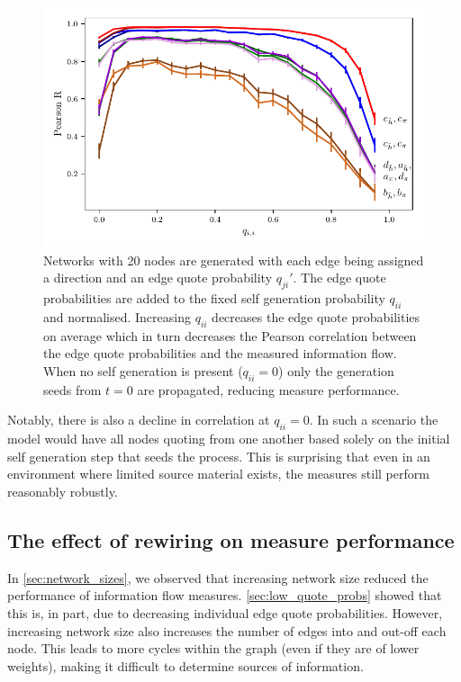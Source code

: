 \begin{figure}[!htbp]
	\centering
	\includegraphics{chapter3/figs/zipf_self_p.pdf}
	\caption{Networks with 20 nodes are generated with each edge being assigned a direction and an edge quote probability $q_{ji}'$. The edge quote probabilities are added to the fixed self generation probability $q_{ii}$ and normalised. Increasing $q_{ii}$ decreases the edge quote probabilities on average which in turn decreases the Pearson correlation between the edge quote probabilities and the measured information flow. When no self generation is present ($q_{ii}=0$) only the generation seeds from $t=0$ are propagated, reducing measure performance.}
	\label{fig:flow_self_p_vs_pearson_R}
\end{figure}

Notably, there is also a decline in correlation at $q_{ii}=0$. In such a scenario the model would have all nodes quoting from one another based solely on the initial self generation step that seeds the process. This is surprising that even in an environment where limited source material exists, the measures still perform reasonably robustly.

\subsection{The effect of rewiring on measure performance}
In \autoref{sec:network_sizes}, we observed that increasing network size reduced the performance of information flow measures. \autoref{sec:low_quote_probs} showed that this is, in part, due to decreasing individual edge quote probabilities. However, increasing network size also increases the number of edges into and out-off each node. This leads to more cycles within the graph (even if they are of lower weights), making it difficult to determine sources of information. 

